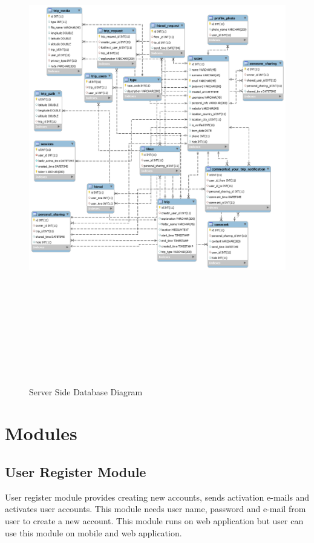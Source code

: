 \begin{figure}[!htbp]
\centering
\includegraphics[width=40em, height=58em]{projectChapters/images/databaseDesign.png}
\caption{Server Side Database Diagram}
\label{fig:serverDatabase}
\end{figure}

\newpage

\section{Modules}

\subsection{User Register Module}
User register module provides creating new accounts, sends activation e-mails and activates user accounts. This module needs user name, password and e-mail from user to create a new account. This module runs on web application but user can use this module on mobile and web application.
